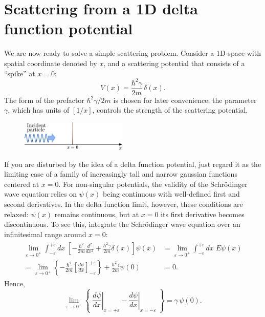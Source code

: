 \documentclass[pra,12pt]{revtex4}
\begin{document}
\section{Scattering from a 1D delta function potential}
\label{sec:1dscatter}

We are now ready to solve a simple scattering problem.  Consider a 1D
space with spatial coordinate denoted by $x$, and a scattering
potential that consists of a ``spike'' at $x = 0$:
\begin{equation}
  V(x) = \frac{\hbar^2\gamma}{2m} \,\delta(x).
\end{equation}
The form of the prefactor $\hbar^2\gamma/2m$ is chosen for later
convenience; the parameter $\gamma$, which has units of $[1/x]$,
controls the strength of the scattering potential.

\begin{figure}[h]
  \centering\includegraphics[width=0.45\textwidth]{scattering1d}
\end{figure}

If you are disturbed by the idea of a delta function potential, just
regard it as the limiting case of a family of increasingly tall and
narrow gaussian functions centered at $x=0$.  For non-singular
potentials, the validity of the Schr\"odinger wave equation relies on
$\psi(x)$ being continuous with well-defined first and second
derivatives.  In the delta function limit, however, these conditions
are relaxed: $\psi(x)$ remains continuous, but at $x=0$ its first
derivative becomes discontinuous.  To see this, integrate the
Schr\"odinger wave equation over an infinitesimal range around $x =
0$:
\begin{align}
  \begin{aligned}\lim_{\varepsilon\rightarrow 0^+} \int_{-\varepsilon}^{+\varepsilon} dx\; \left[-\frac{\hbar^2}{2m} \frac{d^2}{dx^2} + \frac{\hbar^2\gamma}{2m} \delta(x)\right] \psi(x) &= \lim_{\varepsilon\rightarrow 0^+} \int_{-\varepsilon}^{+\varepsilon} dx\; E \psi(x) \\ = \lim_{\varepsilon\rightarrow 0^+} \left\{-\frac{\hbar^2}{2m} \left[\frac{d\psi}{dx}\right]_{-\varepsilon}^{+\varepsilon} \right\} + \frac{\hbar^2\gamma}{2m} \psi(0) &= 0.
  \end{aligned}
\end{align}
Hence,
\begin{equation}
  \lim_{\varepsilon\rightarrow 0^+} \left\{\; \left.\frac{d\psi}{dx}\right|_{x = +\varepsilon} - \left.\frac{d\psi}{dx}\right|_{x = -\varepsilon}\; \right\} =  \gamma \,\psi(0).
  \label{delta_discontinuity}
\end{equation}
\end{document}
